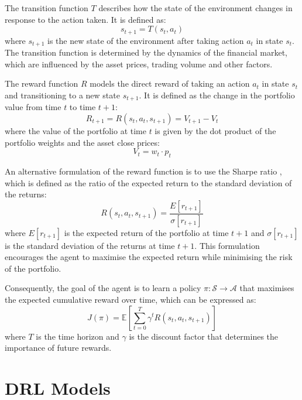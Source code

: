 The transition function $T$ describes how the state of the environment changes in response to the action taken. It is defined as:
\begin{equation}
    s_{t+1} = T(s_t, a_t)
\end{equation}
where $s_{t+1}$ is the new state of the environment after taking action $a_t$ in state $s_t$. The transition function is determined by the dynamics of the financial market, which are influenced by the asset prices, trading volume and other factors.

The reward function $R$ models the direct reward of taking an action $a_t$ in state $s_t$ and transitioning to a new state $s_{t+1}$. It is defined as the change in the portfolio value from time $t$ to time $t+1$:
\begin{equation}
    R_{t+1} = R(s_t, a_t, s_{t+1}) = V_{t+1} - V_t
\end{equation}
where the value of the portfolio at time $t$ is given by the dot product of the portfolio weights and the asset close prices:
\begin{equation}
    V_t = w_t \cdot p_t
\end{equation}

An alternative formulation of the reward function is to use the Sharpe ratio \cite{Sharpe1994}, which is defined as the ratio of the expected return to the standard deviation of the returns:
\begin{equation}
    R(s_t, a_t, s_{t+1}) = \frac{E[r_{t+1}]}{\sigma[r_{t+1}]}
\end{equation}
where $E[r_{t+1}]$ is the expected return of the portfolio at time $t+1$ and $\sigma[r_{t+1}]$ is the standard deviation of the returns at time $t+1$. This formulation encourages the agent to maximise the expected return while minimising the risk of the portfolio.

Consequently, the goal of the agent is to learn a policy $\pi: \mathcal{S} \to \mathcal{A}$ that maximises the expected cumulative reward over time, which can be expressed as:
\begin{equation}
    J(\pi) = \mathbb{E} \left[\sum_{t=0}^{T} \gamma^t R(s_t, a_t, s_{t+1}) \right]
\end{equation} 
where $T$ is the time horizon and $\gamma$ is the discount factor that determines the importance of future rewards. 

\section{DRL Models} \label{sec:drl-models}

